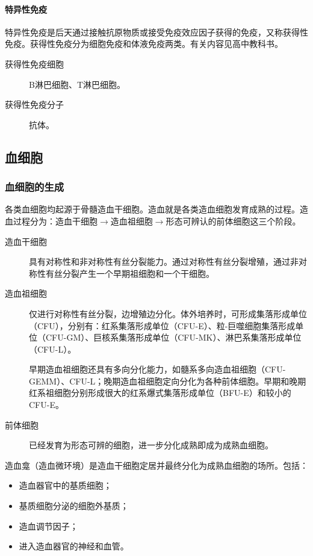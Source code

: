 \paragraph{特异性免疫}

特异性免疫是后天通过接触抗原物质或接受免疫效应因子获得的免疫，又称获得性免疫。获得性免疫分为细胞免疫和体液免疫两类。有关内容见高中教科书。

\begin{description}
	\item[获得性免疫细胞] B淋巴细胞、T淋巴细胞。
	\item[获得性免疫分子] 抗体。
\end{description}

\subsection{血细胞}

\subsubsection{血细胞的生成}

各类血细胞均起源于骨髓造血干细胞。造血就是各类造血细胞发育成熟的过程。造血过程分为：造血干细胞$\longrightarrow$造血祖细胞$\longrightarrow$形态可辨认的前体细胞这三个阶段。

\begin{description}
	\item[造血干细胞] 具有对称性和非对称性有丝分裂能力。通过对称性有丝分裂增殖，通过非对称性有丝分裂产生一个早期祖细胞和一个干细胞。
	\item[造血祖细胞] 仅进行对称性有丝分裂，边增殖边分化。体外培养时，可形成集落形成单位（CFU），分别有：红系集落形成单位（CFU-E）、粒-巨噬细胞集落形成单位（CFU-GM）、巨核系集落形成单位（CFU-MK）、淋巴系集落形成单位（CFU-L）。

	早期造血祖细胞还具有多向分化能力，如髓系多向造血祖细胞（CFU-GEMM）、CFU-L；晚期造血祖细胞定向分化为各种前体细胞。早期和晚期红系祖细胞分别形成很大的红系爆式集落形成单位（BFU-E）和较小的CFU-E。
	\item[前体细胞] 已经发育为形态可辨的细胞，进一步分化成熟即成为成熟血细胞。
\end{description}

造血龛（造血微环境）是造血干细胞定居并最终分化为成熟血细胞的场所。包括：
\begin{itemize}
	\item 造血器官中的基质细胞；
	\item 基质细胞分泌的细胞外基质；
	\item 造血调节因子；
	\item 进入造血器官的神经和血管。
\end{itemize}

